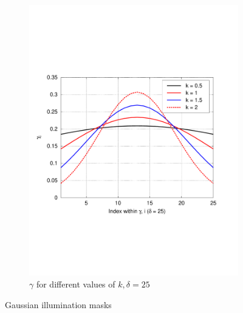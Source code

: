\begin{figure}
\begin{subfigure}[b]{.49\textwidth}
    \includegraphics[width=\textwidth,trim={.4in 2.5in .8in 2.5in}]{figs/gauschart}
    \caption{$\gamma$ for different values of $k, \delta = 25$}
    \label{fig:gausmask}
  \end{subfigure}
  \caption{Gaussian illumination masks}
  \label{fig:gaustables}
\end{figure}

